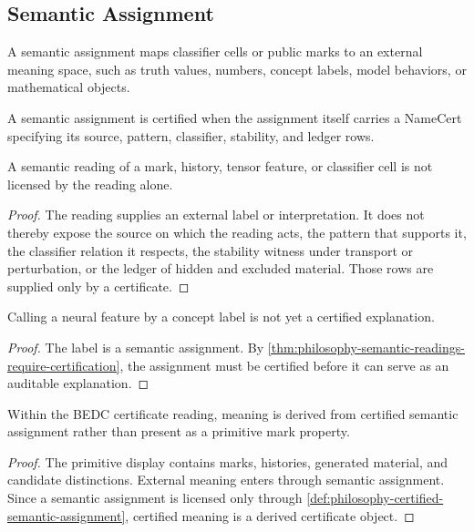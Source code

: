 \subsection{Semantic Assignment}
\label{subsec:philosophy-semantic-assignment}

\begin{definition}
\label{def:philosophy-semantic-assignment}
A semantic assignment maps classifier cells or public marks to an
external meaning space, such as truth values, numbers, concept labels,
model behaviors, or mathematical objects.
\end{definition}

\begin{definition}
\label{def:philosophy-certified-semantic-assignment}
A semantic assignment is certified when the assignment itself carries a
NameCert specifying its source, pattern, classifier, stability, and
ledger rows.
\end{definition}

\begin{theorem}
\label{thm:philosophy-semantic-readings-require-certification}
A semantic reading of a mark, history, tensor feature, or classifier cell
is not licensed by the reading alone.
\end{theorem}
\begin{proof}
The reading supplies an external label or interpretation. It does not
thereby expose the source on which the reading acts, the pattern that
supports it, the classifier relation it respects, the stability witness
under transport or perturbation, or the ledger of hidden and excluded
material. Those rows are supplied only by a certificate.
\end{proof}

\begin{corollary}
\label{cor:philosophy-feature-labels-not-explanations}
Calling a neural feature by a concept label is not yet a certified
explanation.
\end{corollary}
\begin{proof}
The label is a semantic assignment. By
\autoref{thm:philosophy-semantic-readings-require-certification}, the
assignment must be certified before it can serve as an auditable
explanation.
\end{proof}

\begin{theorem}
\label{thm:philosophy-meaning-certificate-derived}
Within the BEDC certificate reading, meaning is derived from certified
semantic assignment rather than present as a primitive mark property.
\end{theorem}
\begin{proof}
The primitive display contains marks, histories, generated material, and
candidate distinctions. External meaning enters through semantic
assignment. Since a semantic assignment is licensed only through
\autoref{def:philosophy-certified-semantic-assignment}, certified meaning
is a derived certificate object.
\end{proof}

